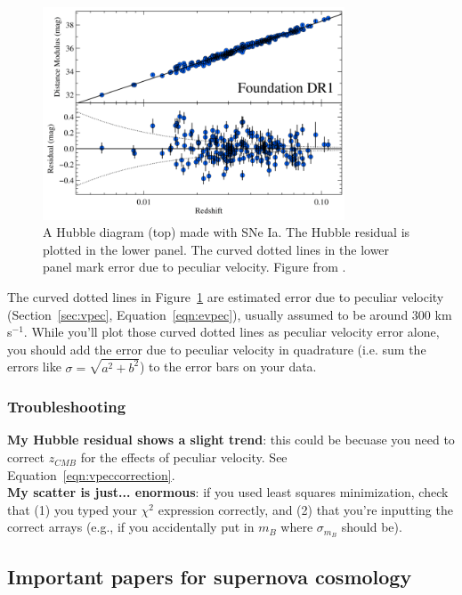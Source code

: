 \begin{figure}[h!]
    \centering
    \includegraphics[width=0.8\textwidth]{figs/hubble-resid.png}
    \caption{A Hubble diagram (top) made with SNe Ia. The Hubble residual is plotted in the lower panel. The curved dotted lines in the lower panel mark error due to peculiar velocity. Figure from \cite{Foley2017}.}
    \label{fig:hresid}
\end{figure}

The curved dotted lines in Figure~\ref{fig:hresid} are estimated error due to peculiar velocity (Section~\ref{sec:vpec}, Equation~\ref{eqn:evpec}), usually assumed to be around 300 km s$^{-1}$. While you'll plot those curved dotted lines as peculiar velocity error alone, you should add the error due to peculiar velocity in quadrature (i.e. sum the errors like $\sigma = \sqrt{a^{2} + b^{2}}$) to the error bars on your data. 

\subsubsection{Troubleshooting}
\textbf{My Hubble residual shows a slight trend}: this could be becuase you need to correct $z_{CMB}$ for the effects of peculiar velocity. See Equation~\ref{eqn:vpeccorrection}.\\

\noindent\textbf{My scatter is just... enormous}: if you used least squares minimization, check that (1) you typed your $\chi^{2}$ expression correctly, and (2) that you're inputting the correct arrays (e.g., if you accidentally put in $m_{B}$ where $\sigma_{m_{B}}$ should be). 

\subsection{Important papers for supernova cosmology}


